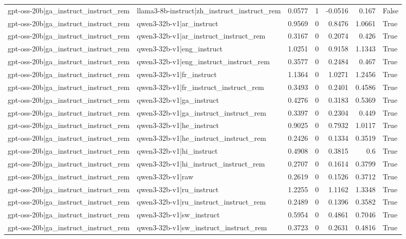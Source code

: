 \begin{table}
\begin{tabular}{l l r r r r l}
gpt-oss-20b|ga_instruct_instruct_rem & llama3-8b-instruct|zh_instruct_instruct_rem & 0.0577 & 1 & -0.0516 & 0.167 & False \\
gpt-oss-20b|ga_instruct_instruct_rem & qwen3-32b-v1|ar_instruct & 0.9569 & 0 & 0.8476 & 1.0661 & True \\
gpt-oss-20b|ga_instruct_instruct_rem & qwen3-32b-v1|ar_instruct_instruct_rem & 0.3167 & 0 & 0.2074 & 0.426 & True \\
gpt-oss-20b|ga_instruct_instruct_rem & qwen3-32b-v1|eng_instruct & 1.0251 & 0 & 0.9158 & 1.1343 & True \\
gpt-oss-20b|ga_instruct_instruct_rem & qwen3-32b-v1|eng_instruct_instruct_rem & 0.3577 & 0 & 0.2484 & 0.467 & True \\
gpt-oss-20b|ga_instruct_instruct_rem & qwen3-32b-v1|fr_instruct & 1.1364 & 0 & 1.0271 & 1.2456 & True \\
gpt-oss-20b|ga_instruct_instruct_rem & qwen3-32b-v1|fr_instruct_instruct_rem & 0.3493 & 0 & 0.2401 & 0.4586 & True \\
gpt-oss-20b|ga_instruct_instruct_rem & qwen3-32b-v1|ga_instruct & 0.4276 & 0 & 0.3183 & 0.5369 & True \\
gpt-oss-20b|ga_instruct_instruct_rem & qwen3-32b-v1|ga_instruct_instruct_rem & 0.3397 & 0 & 0.2304 & 0.449 & True \\
gpt-oss-20b|ga_instruct_instruct_rem & qwen3-32b-v1|he_instruct & 0.9025 & 0 & 0.7932 & 1.0117 & True \\
gpt-oss-20b|ga_instruct_instruct_rem & qwen3-32b-v1|he_instruct_instruct_rem & 0.2426 & 0 & 0.1334 & 0.3519 & True \\
gpt-oss-20b|ga_instruct_instruct_rem & qwen3-32b-v1|hi_instruct & 0.4908 & 0 & 0.3815 & 0.6 & True \\
gpt-oss-20b|ga_instruct_instruct_rem & qwen3-32b-v1|hi_instruct_instruct_rem & 0.2707 & 0 & 0.1614 & 0.3799 & True \\
gpt-oss-20b|ga_instruct_instruct_rem & qwen3-32b-v1|raw & 0.2619 & 0 & 0.1526 & 0.3712 & True \\
gpt-oss-20b|ga_instruct_instruct_rem & qwen3-32b-v1|ru_instruct & 1.2255 & 0 & 1.1162 & 1.3348 & True \\
gpt-oss-20b|ga_instruct_instruct_rem & qwen3-32b-v1|ru_instruct_instruct_rem & 0.2489 & 0 & 0.1396 & 0.3582 & True \\
gpt-oss-20b|ga_instruct_instruct_rem & qwen3-32b-v1|sw_instruct & 0.5954 & 0 & 0.4861 & 0.7046 & True \\
gpt-oss-20b|ga_instruct_instruct_rem & qwen3-32b-v1|sw_instruct_instruct_rem & 0.3723 & 0 & 0.2631 & 0.4816 & True \\

\end{tabular}
\end{table}
